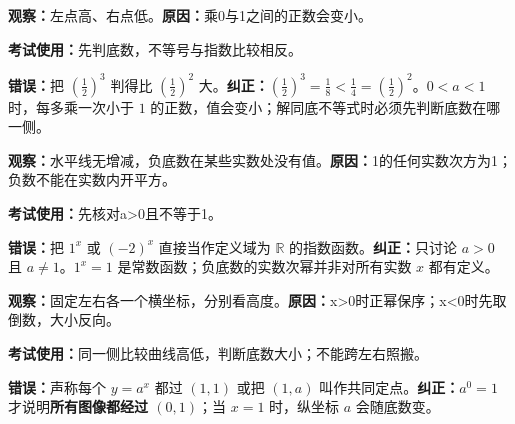\clearpage
\begin{trapbox}

\begin{description}[style=nextline,leftmargin=2.8em,labelsep=0.5em,itemsep=0.45em]
  \item[\textbf{\textcolor{CTrap}{易错点一（指数大，值就一定大？）}}]


\textbf{观察：}左点高、右点低。\quad\textbf{原因：}乘0与1之间的正数会变小。

\textbf{考试使用：}先判底数，不等号与指数比较相反。


  \textbf{错误：}把 $(\frac12)^3$ 判得比 $(\frac12)^2$ 大。\textbf{纠正：}$(\frac12)^3=\frac18<\frac14=(\frac12)^2$。$0<a<1$ 时，每多乘一次小于 $1$ 的正数，值会变小；解同底不等式时必须先判断底数在哪一侧。

\end{description}
\end{trapbox}
\clearpage
\begin{trapbox}
\begin{description}[style=nextline,leftmargin=2.8em,labelsep=0.5em,itemsep=0.45em]
  \item[\textbf{\textcolor{CTrap}{易错点二（忽略底数范围）}}]


\textbf{观察：}水平线无增减，负底数在某些实数处没有值。\quad\textbf{原因：}1的任何实数次方为1；负数不能在实数内开平方。

\textbf{考试使用：}先核对a>0且不等于1。


  \textbf{错误：}把 $1^x$ 或 $(-2)^x$ 直接当作定义域为 $\mathbb R$ 的指数函数。\textbf{纠正：}只讨论 $a>0$ 且 $a\neq1$。$1^x=1$ 是常数函数；负底数的实数次幂并非对所有实数 $x$ 都有定义。

\end{description}
\end{trapbox}
\clearpage
\begin{trapbox}
\begin{description}[style=nextline,leftmargin=2.8em,labelsep=0.5em,itemsep=0.45em]
  \item[\textbf{\textcolor{CTrap}{易错点三（把可变点当定点）}}]


\textbf{观察：}固定左右各一个横坐标，分别看高度。\quad\textbf{原因：}x>0时正幂保序；x<0时先取倒数，大小反向。

\textbf{考试使用：}同一侧比较曲线高低，判断底数大小；不能跨左右照搬。


  \textbf{错误：}声称每个 $y=a^x$ 都过 $(1,1)$ 或把 $(1,a)$ 叫作共同定点。\textbf{纠正：}$a^0=1$ 才说明\textbf{所有图像都经过 $(0,1)$}；当 $x=1$ 时，纵坐标 $a$ 会随底数变。

\end{description}
\end{trapbox}
